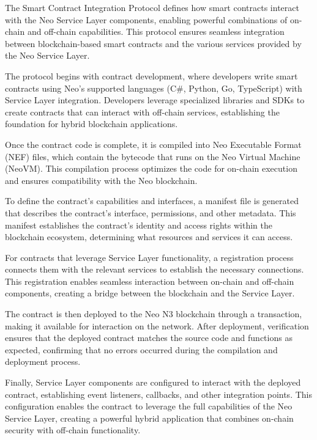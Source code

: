 \documentclass[12pt,a4paper]{article}
\begin{document}
The Smart Contract Integration Protocol defines how smart contracts interact with the Neo Service Layer components, enabling powerful combinations of on-chain and off-chain capabilities. This protocol ensures seamless integration between blockchain-based smart contracts and the various services provided by the Neo Service Layer.



The protocol begins with contract development, where developers write smart contracts using Neo's supported languages (C\#, Python, Go, TypeScript) with Service Layer integration. Developers leverage specialized libraries and SDKs to create contracts that can interact with off-chain services, establishing the foundation for hybrid blockchain applications.

Once the contract code is complete, it is compiled into Neo Executable Format (NEF) files, which contain the bytecode that runs on the Neo Virtual Machine (NeoVM). This compilation process optimizes the code for on-chain execution and ensures compatibility with the Neo blockchain.

To define the contract's capabilities and interfaces, a manifest file is generated that describes the contract's interface, permissions, and other metadata. This manifest establishes the contract's identity and access rights within the blockchain ecosystem, determining what resources and services it can access.

For contracts that leverage Service Layer functionality, a registration process connects them with the relevant services to establish the necessary connections. This registration enables seamless interaction between on-chain and off-chain components, creating a bridge between the blockchain and the Service Layer.

The contract is then deployed to the Neo N3 blockchain through a transaction, making it available for interaction on the network. After deployment, verification ensures that the deployed contract matches the source code and functions as expected, confirming that no errors occurred during the compilation and deployment process.

Finally, Service Layer components are configured to interact with the deployed contract, establishing event listeners, callbacks, and other integration points. This configuration enables the contract to leverage the full capabilities of the Neo Service Layer, creating a powerful hybrid application that combines on-chain security with off-chain functionality.
\end{document}
